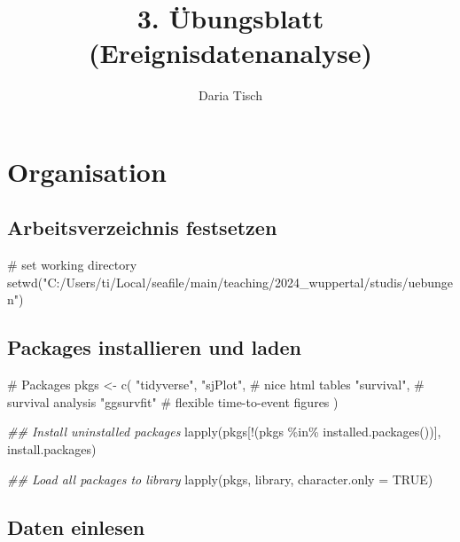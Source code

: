 \documentclass[
  letterpaper,
  DIV=11,
  numbers=noendperiod]{scrartcl}
\title{3. Übungsblatt (Ereignisdatenanalyse)}
\author{Daria Tisch}
\date{}
\newenvironment{Shaded}{\begin{snugshade}}{\end{snugshade}}
\newcommand{\AttributeTok}[1]{\textcolor[rgb]{0.40,0.45,0.13}{#1}}
\newcommand{\CommentTok}[1]{\textcolor[rgb]{0.37,0.37,0.37}{#1}}
\newcommand{\ConstantTok}[1]{\textcolor[rgb]{0.56,0.35,0.01}{#1}}
\newcommand{\DocumentationTok}[1]{\textcolor[rgb]{0.37,0.37,0.37}{\textit{#1}}}
\newcommand{\FunctionTok}[1]{\textcolor[rgb]{0.28,0.35,0.67}{#1}}
\newcommand{\NormalTok}[1]{\textcolor[rgb]{0.00,0.23,0.31}{#1}}
\newcommand{\OtherTok}[1]{\textcolor[rgb]{0.00,0.23,0.31}{#1}}
\newcommand{\SpecialCharTok}[1]{\textcolor[rgb]{0.37,0.37,0.37}{#1}}
\newcommand{\StringTok}[1]{\textcolor[rgb]{0.13,0.47,0.30}{#1}}
\begin{document}
\maketitle


\section{Organisation}\label{organisation}

\subsection{Arbeitsverzeichnis
festsetzen}\label{arbeitsverzeichnis-festsetzen}

\begin{Shaded}
\begin{Highlighting}[]
\CommentTok{\# set working directory}
\FunctionTok{setwd}\NormalTok{(}\StringTok{"C:/Users/ti/Local/seafile/main/teaching/2024\_wuppertal/studis/uebungen"}\NormalTok{)}
\end{Highlighting}
\end{Shaded}

\subsection{Packages installieren und
laden}\label{packages-installieren-und-laden}

\begin{Shaded}
\begin{Highlighting}[]
\CommentTok{\# Packages}
\NormalTok{pkgs }\OtherTok{\textless{}{-}} \FunctionTok{c}\NormalTok{(}
  \StringTok{"tidyverse"}\NormalTok{,}
  \StringTok{"sjPlot"}\NormalTok{, }\CommentTok{\# nice html tables}
  \StringTok{"survival"}\NormalTok{, }\CommentTok{\# survival analysis}
  \StringTok{"ggsurvfit"} \CommentTok{\# flexible time{-}to{-}event figures}
\NormalTok{) }

\DocumentationTok{\#\# Install uninstalled packages}
\FunctionTok{lapply}\NormalTok{(pkgs[}\SpecialCharTok{!}\NormalTok{(pkgs }\SpecialCharTok{\%in\%} \FunctionTok{installed.packages}\NormalTok{())], install.packages)}

\DocumentationTok{\#\# Load all packages to library}
\FunctionTok{lapply}\NormalTok{(pkgs, library, }\AttributeTok{character.only =} \ConstantTok{TRUE}\NormalTok{)}
\end{Highlighting}
\end{Shaded}

\subsection{Daten einlesen}\label{daten-einlesen}
\end{document}
